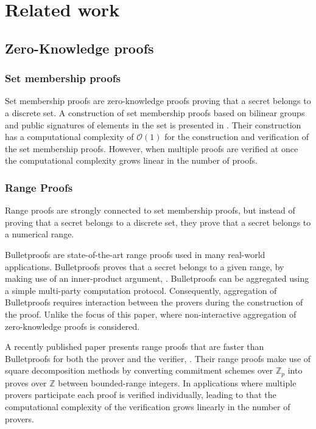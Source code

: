 \section*{Related work}

\subsection*{Zero-Knowledge proofs}

\subsubsection*{Set membership proofs}
Set membership proofs are zero-knowledge proofs proving that a secret belongs to a discrete  set. A construction of set membership proofs based on bilinear groups and public signatures of elements in the set is presented in \cite{RANGE-SET}. Their construction has a computational complexity of $\mathcal{O}(1)$ for the construction and verification of the set membership proofs. However, when multiple proofs are verified at once the computational complexity grows linear in the number of proofs. 

\subsubsection*{Range Proofs}
Range proofs are strongly connected to set membership proofs, but instead of proving that a secret belongs to a discrete set, they prove that a secret belongs to a numerical range.

Bulletproofs are state-of-the-art range proofs used in many real-world applications. Bulletproofs proves  that a secret belongs to a given range, by making use of an inner-product argument, \cite{bulletProofs_theory}. Bulletproofs can be aggregated using a simple multi-party computation protocol. Consequently, aggregation of Bulletproofs requires interaction between the provers during the construction of the proof. Unlike the focus of this paper, where non-interactive aggregation of zero-knowledge proofs is considered.

A recently published paper presents range proofs that are faster than Bulletproofs for both the prover and the verifier, \cite{improveBulletproofs}. Their range proofs make use of square decomposition methods by converting commitment schemes over $\mathds{Z}_p$ into proves over $\mathds{Z}$ between bounded-range integers. In applications where multiple provers participate each proof is verified individually, leading to that the computational complexity of the verification grows linearly in the number of provers. 


